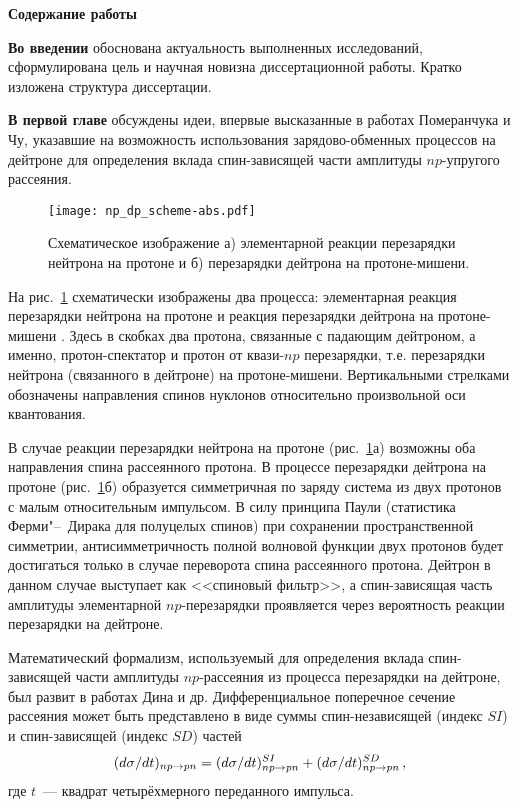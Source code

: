 \vspace{1ex}
\begin{center}
  {\large\textbf{Содержание работы}}
\end{center}

\textbf{Во введении} обоснована актуальность выполненных исследований,
сформулирована цель и научная новизна диссертационной работы. Кратко изложена
структура диссертации.

\vspace{1ex}
\textbf{В первой главе} обсуждены идеи, впервые высказанные в работах
Померанчука и Чу, указавшие на возможность использования зарядово-обменных
процессов на дейтроне для определения вклада спин-зависящей части амплитуды
$np$-упругого рассеяния.

\begin{figure}[h]
  \centering
  \texttt{[image: np\_dp\_scheme-abs.pdf]}
  \caption{Схематическое изображение а) элементарной реакции перезарядки
    нейтрона на протоне и б) перезарядки дейтрона на протоне-мишени.}
  \label{fig:np_dp_scheme}
\end{figure}

На рис.~\ref{fig:np_dp_scheme} схематически изображены два процесса:
элементарная реакция перезарядки нейтрона на протоне \np и реакция перезарядки
дейтрона на протоне-мишени \dpchex. Здесь в скобках два протона, связанные с
падающим дейтроном, а именно, протон-спектатор и протон от квази-$np$
перезарядки, т.е. перезарядки нейтрона (связанного в дейтроне) на
протоне-мишени. Вертикальными стрелками обозначены направления спинов нуклонов
относительно произвольной оси квантования.

В случае реакции перезарядки нейтрона на протоне (рис.~\ref{fig:np_dp_scheme}а)
возможны оба направления спина рассеянного протона. В процессе перезарядки
дейтрона на протоне (рис.~\ref{fig:np_dp_scheme}б) образуется симметричная
по заряду система из двух протонов с малым относительным импульсом. В силу
принципа Паули (статистика Ферми"--~Дирака для полуцелых спинов) при сохранении
пространственной симметрии, антисимметричность полной волновой функции двух
протонов будет достигаться только в случае переворота спина рассеянного протона.
Дейтрон в данном случае выступает как <<спиновый фильтр>>, а спин-зависящая
часть амплитуды элементарной $np$-перезарядки проявляется через вероятность
реакции перезарядки на дейтроне.

Математический формализм, используемый для определения вклада спин-зависящей
части амплитуды $np$-рассеяния из процесса перезарядки на дейтроне, был развит
в работах Дина и др. Дифференциальное поперечное сечение \np рассеяния может
быть представлено в виде суммы спин-независящей (индекс {\small$SI$}) и
спин-зависящей (индекс {\small$SD$}) частей
\begin{equation}
  \label{eq:np}
  (d\sigma/dt)_{np \rightarrow pn} = (d\sigma/dt)^{SI}_{np \rightarrow pn} + (d\sigma/dt)^{SD}_{np \rightarrow pn}\,,
\end{equation}
где $t$~--- квадрат четырёхмерного переданного импульса.

